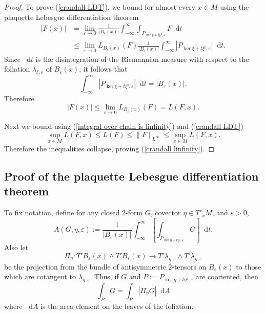 \documentclass[reqno,11pt]{amsart}
\newcommand*\dif{\mathop{}\!\mathrm{d}}
\theoremstyle{definition}
\numberwithin{equation}{section}
\begin{document}
\begin{proof}
To prove (\ref{crandall LDT}), we bound for almost every $x \in M$ using the plaquette Lebesgue differentiation theorem
\begin{align*}
|F(x)|
&= \lim_{\varepsilon \to 0} \frac{1}{|B_\varepsilon(x)|} \int_{-\infty}^\infty \int_{P_{\ker \xi + t\xi^\sharp, \varepsilon}} F \dif t \\
&\leq \lim_{\varepsilon \to 0} L_{B_\varepsilon(x)}(F) \frac{1}{|B_\varepsilon(x)|} \int_{-\infty}^\infty |P_{\ker \xi + t\xi^\sharp, \varepsilon}| \dif t.
\end{align*}
Since $\dif t$ is the disintegration of the Riemannian measure with respect to the foliation $\lambda_{\xi, \varepsilon}$ of $B_\varepsilon(x)$,  it follows that 
$$\int_{-\infty}^\infty |P_{\ker \xi + t\xi^\sharp, \varepsilon}| \dif t = |B_\varepsilon(x)|.$$
Therefore
$$|F(x)| \leq \lim_{\varepsilon \to 0} L_{B_\varepsilon(x)}(F) = L(F, x).$$

Next we bound using (\ref{integral over chain is linfinity}) and (\ref{crandall LDT})
$$\sup_{x \in M} L(F, x) \leq L(F) \leq \|F\|_{L^\infty} \leq \sup_{x \in M} L(F, x).$$
Therefore the inequalities collapse, proving (\ref{crandall linfinity}).
\end{proof}

\subsection{Proof of the plaquette Lebesgue differentiation theorem}\label{proof of PLDT}

To fix notation, define for any closed $2$-form $G$, covector $\eta \in T'_x M$, and $\varepsilon > 0$,
$$A(G, \eta, \varepsilon) := \frac{1}{|B_\varepsilon(x)|} \int_{-\infty}^\infty \left[\int_{P_{\ker \eta + t\eta^\sharp, \varepsilon}} G\right] \dif t.$$
Also let 
$$\Pi_\eta: T' B_\varepsilon(x) \wedge T' B_\varepsilon(x) \to T' \lambda_{\eta, \varepsilon} \wedge T' \lambda_{\eta, \varepsilon}$$
be the projection from the bundle of antisymmetric $2$-tensors on $B_\varepsilon(x)$ to those which are cotangent to $\lambda_{\eta, \varepsilon}$.
Thus, if $G$ and $P := P_{\ker \eta + t\eta^\sharp, \varepsilon}$ are cooriented, then
\begin{equation}\label{cooriented integral is area integral of norm}
	\int_P G = \int_P |\Pi_\eta G| \dif A
\end{equation}
where $\dif A$ is the area element on the leaves of the foliation.
\end{document}
